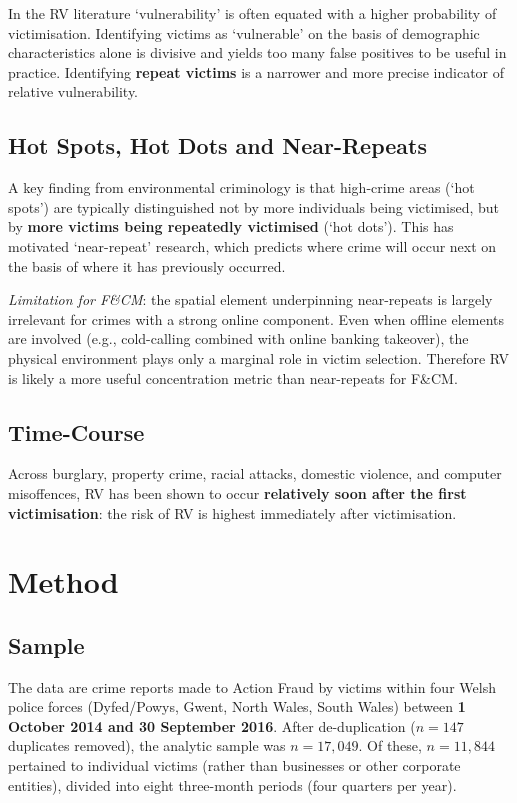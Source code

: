 \documentclass[11pt,a4paper,openany]{report}
\theoremstyle{definition}
\theoremstyle{plain}
\theoremstyle{remark}
\begin{document}
In the RV literature `vulnerability' is often equated with a higher probability of victimisation. Identifying victims as `vulnerable' on the basis of demographic characteristics alone is divisive and yields too many false positives to be useful in practice. Identifying \textbf{repeat victims} is a narrower and more precise indicator of relative vulnerability.

\subsection{Hot Spots, Hot Dots and Near-Repeats}

A key finding from environmental criminology is that high-crime areas (`hot spots') are typically distinguished not by more individuals being victimised, but by \textbf{more victims being repeatedly victimised} (`hot dots'). This has motivated `near-repeat' research, which predicts where crime will occur next on the basis of where it has previously occurred.

\textit{Limitation for F\&CM}: the spatial element underpinning near-repeats is largely irrelevant for crimes with a strong online component. Even when offline elements are involved (e.g., cold-calling combined with online banking takeover), the physical environment plays only a marginal role in victim selection. Therefore RV is likely a more useful concentration metric than near-repeats for F\&CM.

\subsection{Time-Course}

Across burglary, property crime, racial attacks, domestic violence, and computer misoffences, RV has been shown to occur \textbf{relatively soon after the first victimisation}: the risk of RV is highest immediately after victimisation.

\section{Method}

\subsection{Sample}

The data are crime reports made to Action Fraud by victims within four Welsh police forces (Dyfed/Powys, Gwent, North Wales, South Wales) between \textbf{1 October 2014 and 30 September 2016}. After de-duplication ($n = 147$ duplicates removed), the analytic sample was $n = 17{,}049$. Of these, $n = 11{,}844$ pertained to individual victims (rather than businesses or other corporate entities), divided into eight three-month periods (four quarters per year).
\end{document}
